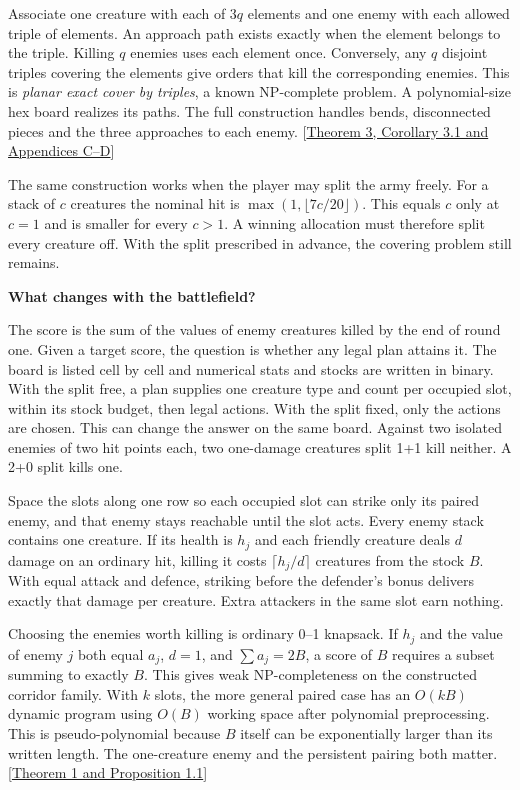 \documentclass[11pt,a4paper]{article}
\newcommand{\titleline}[1]{{\sffamily\bfseries\fontsize{22}{25}\selectfont #1\par}\vspace{4pt}}
\newcommand{\topic}[1]{\par\addvspace{7pt}{\sffamily\bfseries\large #1\par}\nobreak\vspace{-2pt}}
\newcommand{\edition}{https://github.com/uson1x/homm3-hardness}
\begin{document}
Associate one creature with each of $3q$ elements and one enemy with each allowed triple of elements. An approach path exists exactly when the element belongs to the triple. Killing $q$ enemies uses each element once. Conversely, any $q$ disjoint triples covering the elements give orders that kill the corresponding enemies. This is \emph{planar exact cover by triples}, a known NP-complete problem. A polynomial-size hex board realizes its paths. The full construction handles bends, disconnected pieces and the three approaches to each enemy. [\href{\edition/blob/v1.8/paper/main.md\#appendix-d-the-full-proof-of-theorem-3}{Theorem 3, Corollary 3.1 and Appendices C--D}]

The same construction works when the player may split the army freely. For a stack of $c$ creatures the nominal hit is $\max(1,\lfloor 7c/20\rfloor)$. This equals $c$ only at $c=1$ and is smaller for every $c>1$. A winning allocation must therefore split every creature off. With the split prescribed in advance, the covering problem still remains.

\newpage
\titleline{What changes with the battlefield?}
The score is the sum of the values of enemy creatures killed by the end of round one. Given a target score, the question is whether any legal plan attains it. The board is listed cell by cell and numerical stats and stocks are written in binary. With the split free, a plan supplies one creature type and count per occupied slot, within its stock budget, then legal actions. With the split fixed, only the actions are chosen. This can change the answer on the same board. Against two isolated enemies of two hit points each, two one-damage creatures split 1+1 kill neither. A 2+0 split kills one.

\topic{One slot per enemy}
Space the slots along one row so each occupied slot can strike only its paired enemy, and that enemy stays reachable until the slot acts. Every enemy stack contains one creature. If its health is $h_j$ and each friendly creature deals $d$ damage on an ordinary hit, killing it costs $\lceil h_j/d\rceil$ creatures from the stock $B$. With equal attack and defence, striking before the defender's bonus delivers exactly that damage per creature. Extra attackers in the same slot earn nothing.

Choosing the enemies worth killing is ordinary 0--1 knapsack. If $h_j$ and the value of enemy $j$ both equal $a_j$, $d=1$, and $\sum a_j=2B$, a score of $B$ requires a subset summing to exactly $B$. This gives weak NP-completeness on the constructed corridor family. With $k$ slots, the more general paired case has an $O(kB)$ dynamic program using $O(B)$ working space after polynomial preprocessing. This is pseudo-polynomial because $B$ itself can be exponentially larger than its written length. The one-creature enemy and the persistent pairing both matter. [\href{\edition/blob/v1.8/paper/main.md\#theorem-1}{Theorem 1 and Proposition 1.1}]
\end{document}
